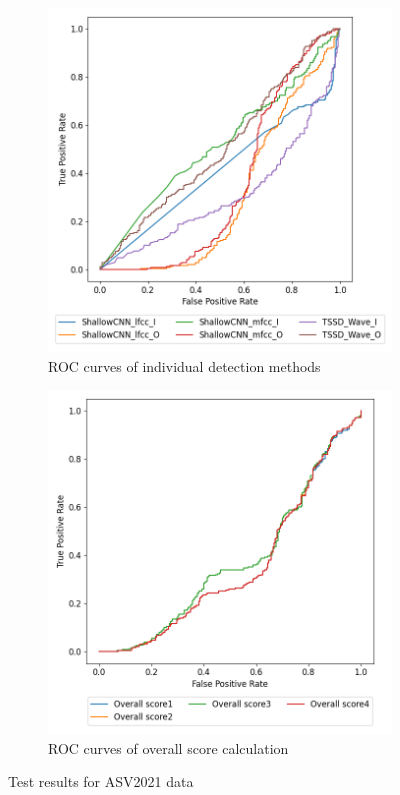 \begin{figure}[H]
    \begin{subfigure}[h]{0.5\linewidth}
        \centering
        \includegraphics[width=1\linewidth]{other-fig/tests/asv_methods.png}
        \caption{ROC curves of individual detection methods}
        \label{fig:asv2021_method_results}
    \end{subfigure}
    \hfill
    \begin{subfigure}[h]{0.5\linewidth}
        \centering
        \includegraphics[width=1\linewidth]{other-fig/tests/asv_overall_score.png}
        \caption{ROC curves of overall score calculation}
        \label{fig:asv2021_overall_score}
    \end{subfigure}
    \caption{Test results for ASV2021 data}
\end{figure}

